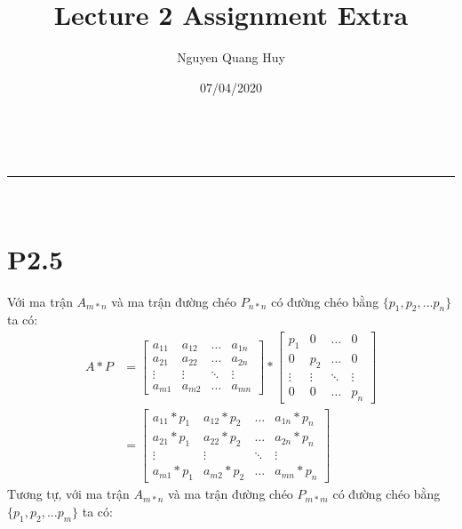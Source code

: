 \documentclass[a4paper,11pt]{article}
\makeatletter
\newcommand{\linia}{\rule{\linewidth}{0.5pt}}
\theoremstyle{mytheor}
\renewcommand{\maketitle}{
\begin{center}
\vspace{2ex}
{\huge \textsc{\@title}}
\vspace{1ex}
\\
\linia\\
\@author \hfill \@date
\vspace{4ex}
\end{center}
}
\makeatother
\begin{document}
\title{Lecture 2 Assignment Extra}

\author{Nguyen Quang Huy}

\date{07/04/2020}

\maketitle

\section*{P2.5}

Với ma trận $A_{m*n}$ và ma trận đường chéo $P_{n*n}$ có đường chéo bằng $\{p_1,p_2,...p_n\}$ ta có:
\begin{align}
    \nonumber A*P &= \begin{bmatrix} a_{11} & a_{12} & \hdots & a_{1n} \\ 
                        a_{21} & a_{22} & \hdots & a_{2n} \\
                        \vdots & \vdots & \ddots & \vdots \\
                        a_{m1} & a_{m2} & \hdots & a_{mn}
                        \end{bmatrix}
        * \begin{bmatrix} p_1 & 0 & \hdots & 0\\
                        0 & p_2 & \hdots & 0 \\
                        \vdots & \vdots & \ddots & \vdots \\
                        0 & 0 & \hdots & p_n
                        \end{bmatrix}
        \\
    \nonumber     &= \begin{bmatrix} a_{11}*p_1 & a_{12}*p_2 & \hdots & a_{1n}*p_n \\ 
                        a_{21}*p_1 & a_{22}*p_2 & \hdots & a_{2n}*p_n \\
                        \vdots & \vdots & \ddots & \vdots \\
                        a_{m1}*p_1 & a_{m2}*p_2 & \hdots & a_{mn}*p_n
                        \end{bmatrix}
\end{align}
Tương tự, với ma trận $A_{m*n}$ và ma trận đường chéo $P_{m*m}$ có đường chéo bằng $\{p_1,p_2,...p_m\}$ ta có:
\end{document}

